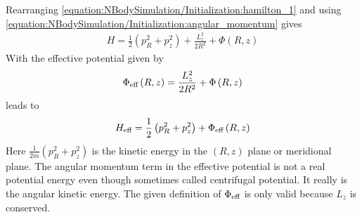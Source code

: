 \documentclass[letterpaper,10pt,english]{sphinxmanual}
\begin{document}
\sphinxAtStartPar
Rearranging \eqref{equation:NBodySimulation/Initialization:hamilton_1} and using \eqref{equation:NBodySimulation/Initialization:angular_momentum} gives
\begin{equation*}
\begin{split}H = \frac{1}{2}\left( p_{R}^2+p_z^2 \right)+\frac{L_z^2}{2R^2}+\Phi\left(R,z\right)\end{split}
\end{equation*}
\sphinxAtStartPar
With the effective potential given by
\begin{equation*}
\begin{split}\Phi_{\textup{eff}}\left(R,z\right) = \frac{L_z^2}{2R^2}+\Phi\left(R,z\right)\end{split}
\end{equation*}
\sphinxAtStartPar
leads to
\begin{equation*}
\begin{split}H_{\textup{eff}} = \frac{1}{2}\left( p_{R}^2+p_z^2 \right)+\Phi_{\textup{eff}}\left(R,z\right)\end{split}
\end{equation*}
\sphinxAtStartPar
Here \(\frac{1}{2m}\left( p_{R}^2+p_z^2 \right)\) is the kinetic energy in the \(\left( R,z \right)\) plane or meridional plane.
The angular momentum term in the effective potential is not a real potential energy even though sometimes called centrifugal potential.
It really is the angular kinetic energy. The given definition of \(\Phi_{\textup{eff}}\) is only valid because \(L_z\) is conserved.
\end{document}
